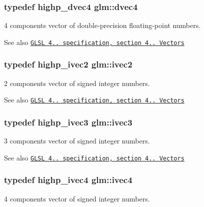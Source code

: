 \subsubsection[{\texorpdfstring{dvec4}{dvec4}}]{\setlength{\rightskip}{0pt plus 5cm}typedef highp\+\_\+dvec4 {\bf glm\+::dvec4}}\hypertarget{group__core__types_ga0824ceed7ec3b2fba89765501c1540b5}{}\label{group__core__types_ga0824ceed7ec3b2fba89765501c1540b5}
4 components vector of double-\/precision floating-\/point numbers.

\begin{DoxySeeAlso}{See also}
\href{http://www.opengl.org/registry/doc/GLSLangSpec.4.20.8.pdf}{\tt G\+L\+SL 4.. specification, section 4.. Vectors} 
\end{DoxySeeAlso}
\subsubsection[{\texorpdfstring{ivec2}{ivec2}}]{\setlength{\rightskip}{0pt plus 5cm}typedef highp\+\_\+ivec2 {\bf glm\+::ivec2}}\hypertarget{group__core__types_ga9e6ce9cfc7919976b318197e18d8a065}{}\label{group__core__types_ga9e6ce9cfc7919976b318197e18d8a065}
2 components vector of signed integer numbers.

\begin{DoxySeeAlso}{See also}
\href{http://www.opengl.org/registry/doc/GLSLangSpec.4.20.8.pdf}{\tt G\+L\+SL 4.. specification, section 4.. Vectors} 
\end{DoxySeeAlso}
\subsubsection[{\texorpdfstring{ivec3}{ivec3}}]{\setlength{\rightskip}{0pt plus 5cm}typedef highp\+\_\+ivec3 {\bf glm\+::ivec3}}\hypertarget{group__core__types_ga6e12a4ca00d696f07da1df4eb73e0fe8}{}\label{group__core__types_ga6e12a4ca00d696f07da1df4eb73e0fe8}
3 components vector of signed integer numbers.

\begin{DoxySeeAlso}{See also}
\href{http://www.opengl.org/registry/doc/GLSLangSpec.4.20.8.pdf}{\tt G\+L\+SL 4.. specification, section 4.. Vectors} 
\end{DoxySeeAlso}
\subsubsection[{\texorpdfstring{ivec4}{ivec4}}]{\setlength{\rightskip}{0pt plus 5cm}typedef highp\+\_\+ivec4 {\bf glm\+::ivec4}}\hypertarget{group__core__types_gaa4560ddc50320ea8f8a70d5c9c249fea}{}\label{group__core__types_gaa4560ddc50320ea8f8a70d5c9c249fea}
4 components vector of signed integer numbers.

